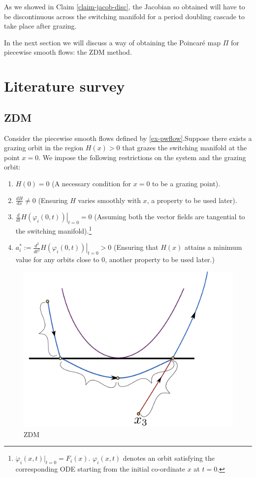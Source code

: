 \documentclass{book}
\renewcommand{\(}{\begin{columns}}
\renewcommand{\)}{\end{columns}}
\newcommand{\<}[1]{\begin{column}{#1}}
\renewcommand{\>}{\end{column}}
\begin{document}
As we showed in Claim \ref{claim-jacob-disc}, the Jacobian so obtained will 
have to be discontinuous across the switching manifold for a period doubling 
cascade to take place after grazing.  


In the next section we will discuss a way of obtaining the Poincaré map 
$\Pi$ for piecewise smooth flows: the ZDM method.  

\section{Literature survey}
\subsection{ZDM}
\label{prop-ZDM}
Consider the piecewise smooth flows defined by \eqref{ex-pwflow}.Suppose 
there exists a grazing orbit in the region $H(x)>0$ that grazes the switching 
manifold at the point $x=0$.  We impose the following restrictions on the 
system and the grazing orbit:

\begin{enumerate}
\item $H(0)=0$ (A necessary condition for $x=0$ to be a grazing point).
\item $\frac{dH}{dx}\neq 0$ (Ensuring $H$ varies smoothly with $x$, a property 
to be used later).
\item $\frac{d}{dt}\left.  H(\varphi_i(0,t))\right|_{t=0}=0$ (Assuming both 
the vector fields are tangential to the switching manifold).\footnote{
$\dot{\varphi}_i(x,t)|_{t=0}=F_i(x)$.  $\varphi_i(x,t)$ denotes an orbit 
satisfying the corresponding ODE starting from the initial co-ordinate 
$x$ at $t=0$.  }
\item $a_i^*:=\frac{d^2}{dt^2}\left.  H(\varphi_i(0,t))\right|_{t=0}>0$ 
(Ensuring that $H(x)$ attains a minimum value for any orbits close to $0$, 
another property to be used later.)\label{crit-minH}
\end{enumerate}

\begin{figure}[!htp]
\caption{ZDM}
\label{fig-ZDM}
\begin{center}
\includegraphics[width=0.4\columnwidth]{ZDM_eval}
\end{center}
\end{figure}
\end{document}
